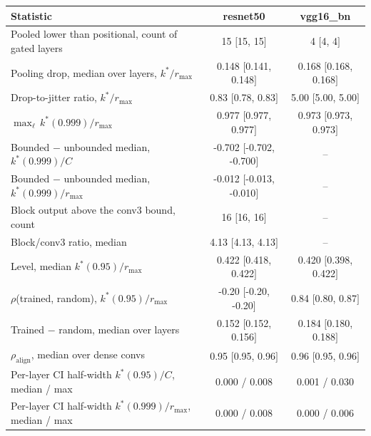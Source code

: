 \begin{tabular}{l c c}
\toprule
Statistic & resnet50 & vgg16\_bn \\
\midrule
Pooled lower than positional, count of gated layers & 15 $[$15, 15$]$ & 4 $[$4, 4$]$ \\
Pooling drop, median over layers, $k^*/r_{\max}$ & 0.148 $[$0.141, 0.148$]$ & 0.168 $[$0.168, 0.168$]$ \\
Drop-to-jitter ratio, $k^*/r_{\max}$ & 0.83 $[$0.78, 0.83$]$ & 5.00 $[$5.00, 5.00$]$ \\
$\max_\ell\, k^*(0.999)/r_{\max}$ & 0.977 $[$0.977, 0.977$]$ & 0.973 $[$0.973, 0.973$]$ \\
Bounded $-$ unbounded median, $k^*(0.999)/C$ & -0.702 $[$-0.702, -0.700$]$ & -- \\
Bounded $-$ unbounded median, $k^*(0.999)/r_{\max}$ & -0.012 $[$-0.013, -0.010$]$ & -- \\
Block output above the conv3 bound, count & 16 $[$16, 16$]$ & -- \\
Block/conv3 ratio, median & 4.13 $[$4.13, 4.13$]$ & -- \\
Level, median $k^*(0.95)/r_{\max}$ & 0.422 $[$0.418, 0.422$]$ & 0.420 $[$0.398, 0.422$]$ \\
$\rho$(trained, random), $k^*(0.95)/r_{\max}$ & -0.20 $[$-0.20, -0.20$]$ & 0.84 $[$0.80, 0.87$]$ \\
Trained $-$ random, median over layers & 0.152 $[$0.152, 0.156$]$ & 0.184 $[$0.180, 0.188$]$ \\
$\rho_{\mathrm{align}}$, median over dense convs & 0.95 $[$0.95, 0.96$]$ & 0.96 $[$0.95, 0.96$]$ \\
Per-layer CI half-width $k^*(0.95)/C$, median / max & 0.000 / 0.008 & 0.001 / 0.030 \\
Per-layer CI half-width $k^*(0.999)/r_{\max}$, median / max & 0.000 / 0.008 & 0.000 / 0.006 \\
\bottomrule
\end{tabular}
